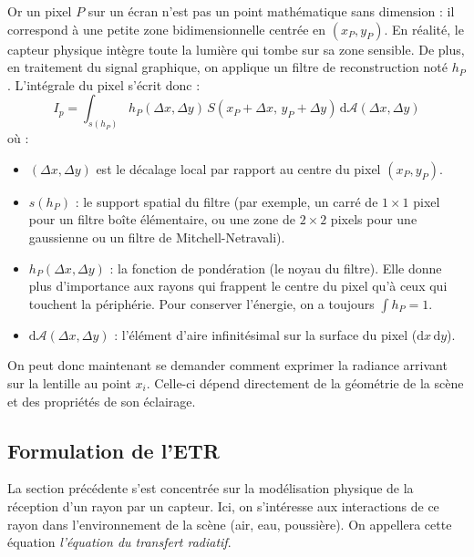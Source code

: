 Or un pixel $P$ sur un écran n'est pas un point mathématique sans dimension : il correspond à une petite zone bidimensionnelle centrée en $(x_P, y_P)$. En réalité, le capteur physique intègre toute la lumière qui tombe sur sa zone sensible. De plus, en traitement du signal graphique, on applique un filtre de reconstruction noté $h_P$. L'intégrale du pixel s'écrit donc :
\begin{equation}
    I_p = \int_{s(h_P)} h_P(\Delta x, \Delta y) \, S(x_P + \Delta x, \, y_P + \Delta y) \, \mathrm{d}\mathcal{A}(\Delta x, \Delta y)
\end{equation}
où : 
\begin{itemize}
    \item $(\Delta x, \Delta y)$ est le décalage local par rapport au centre du pixel $(x_P, y_P)$.
    \item $s(h_P)$ : le support spatial du filtre (par exemple, un carré de $1 \times 1$ pixel pour un filtre boîte élémentaire, ou une zone de $2 \times 2$ pixels pour une gaussienne ou un filtre de Mitchell-Netravali).
    \item $h_P(\Delta x, \Delta y)$ : la fonction de pondération (le noyau du filtre). Elle donne plus d'importance aux rayons qui frappent le centre du pixel qu'à ceux qui touchent la périphérie. Pour conserver l'énergie, on a toujours $\int h_P = 1$.
    \item $\mathrm{d}\mathcal{A}(\Delta x, \Delta y)$ : l'élément d'aire infinitésimal sur la surface du pixel ($\mathrm{d}x\,\mathrm{d}y$). 
\end{itemize}

On peut donc maintenant se demander comment exprimer la radiance arrivant sur la lentille au point $x_i$. Celle-ci dépend directement de la géométrie de la scène et des propriétés de son éclairage. 

\subsection{Formulation de l'ETR}

La section précédente s'est concentrée sur la modélisation physique de la réception d'un rayon par un capteur. Ici, on s'intéresse aux interactions de ce rayon dans l'environnement de la scène (air, eau, poussière). On appellera cette équation \emph{l'équation du transfert radiatif}. 




